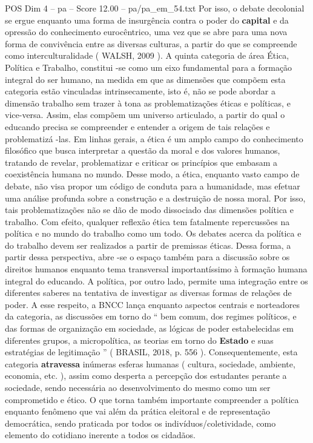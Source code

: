 \begin{textsample}{POS Dim 4 – pa – Score 12.00 – pa/pa\_em\_54.txt}
Por isso, o debate decolonial se ergue enquanto uma forma de insurgência contra o poder do \textbf{capital} e da opressão do conhecimento eurocêntrico, uma vez que se abre para uma nova forma de convivência entre as diversas culturas, a partir do que se compreende como interculturalidade ( WALSH, 2009 ).
A quinta categoria de área Ética, Política e Trabalho, constitui -se como um eixo fundamental para a formação integral do ser humano, na medida em que as dimensões que compõem esta categoria estão vinculadas intrinsecamente, isto é, não se pode abordar a dimensão trabalho sem trazer à tona as problematizações éticas e políticas, e vice-versa.
Assim, elas compõem um universo articulado, a partir do qual o educando precisa se compreender e entender a origem de tais relações e problematizá -las.
Em linhas gerais, a ética é um amplo campo do conhecimento filosófico que busca interpretar a questão da moral e dos valores humanos, tratando de revelar, problematizar e criticar os princípios que embasam a coexistência humana no mundo.
Desse modo, a ética, enquanto vasto campo de debate, não visa propor um código de conduta para a humanidade, mas efetuar uma análise profunda sobre a construção e a destruição de nossa moral.
Por isso, tais problematizações não se dão de modo dissociado das dimensões política e trabalho.
Com efeito, qualquer reflexão ética tem fatalmente repercussões na política e no mundo do trabalho como um todo.
Os debates acerca da política e do trabalho devem ser realizados a partir de premissas éticas.
Dessa forma, a partir dessa perspectiva, abre -se o espaço também para a discussão sobre os direitos humanos enquanto tema transversal importantíssimo à formação humana integral do educando.
A política, por outro lado, permite uma integração entre os diferentes saberes na tentativa de investigar as diversas formas de relações de poder.
A esse respeito, a BNCC lança enquanto aspectos centrais e norteadores da categoria, as discussões em torno do “ bem comum, dos regimes políticos, e das formas de organização em sociedade, as lógicas de poder estabelecidas em diferentes grupos, a micropolítica, as teorias em torno do \textbf{Estado} e suas estratégias de legitimação ” ( BRASIL, 2018, p. 556 ).
Consequentemente, esta categoria \textbf{atravessa} inúmeras esferas humanas ( cultura, sociedade, ambiente, economia, etc. ), assim como desperta a percepção dos estudantes perante a sociedade, sendo necessária ao desenvolvimento do mesmo como um ser comprometido e ético.
O que torna também importante compreender a política enquanto fenômeno que vai além da prática eleitoral e de representação democrática, sendo praticada por todos os indivíduos/coletividade, como elemento do cotidiano inerente a todos os cidadãos.

\end{textsample}
